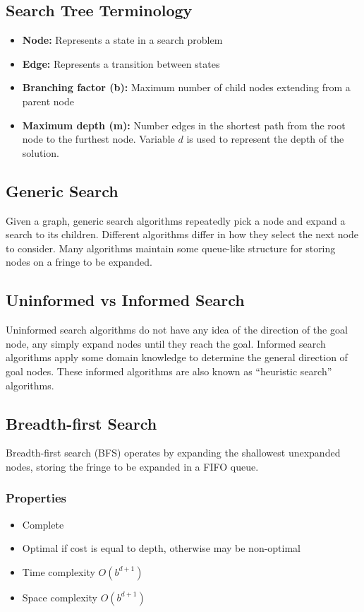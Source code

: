 \documentclass[12pt,titlepage]{article}
\begin{document}
    \subsection{Search Tree Terminology}
      \begin{itemize}
        \item \textbf{Node:} Represents a state in a search problem
        \item \textbf{Edge:} Represents a transition between states
        \item \textbf{Branching factor (b):} Maximum number of child nodes extending from a parent node
        \item \textbf{Maximum depth (m):} Number edges in the shortest path from the root node to the furthest node.
        Variable $d$ is used to represent the depth of the solution.
      \end{itemize}

    \subsection{Generic Search}
      Given a graph, generic search algorithms repeatedly pick a node and expand a search to its children. Different algorithms
      differ in how they select the next node to consider. Many algorithms maintain some queue-like structure for storing nodes
      on a fringe to be expanded.

    \subsection{Uninformed vs Informed Search}
      Uninformed search algorithms do not have any idea of the direction of the goal node, any simply expand nodes until they
      reach the goal. Informed search algorithms apply some domain knowledge to determine the general direction of goal nodes.
      These informed algorithms are also known as ``heuristic search'' algorithms.

    \subsection{Breadth-first Search}
      Breadth-first search (BFS) operates by expanding the shallowest unexpanded nodes, storing the fringe to be expanded in a FIFO
      queue.

      \subsubsection{Properties}
        \begin{itemize}
          \item Complete
          \item Optimal if cost is equal to depth, otherwise may be non-optimal
          \item Time complexity $O(b^{d+1})$
          \item Space complexity $O(b^{d+1})$
        \end{itemize}
\end{document}
